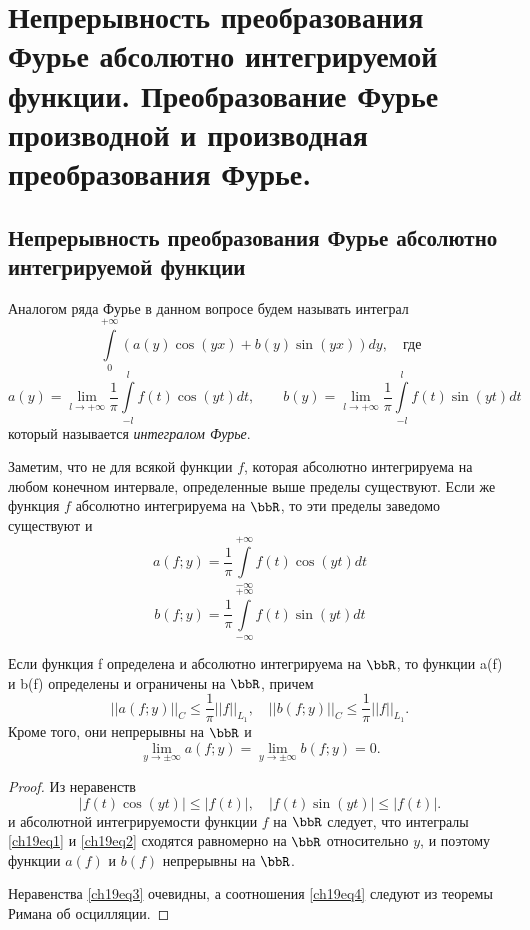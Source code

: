 \chapter{Непрерывность преобразования Фурье абсолютно интегрируемой функции. Преобразование Фурье производной и производная преобразования Фурье.}

\section{Непрерывность преобразования Фурье абсолютно интегрируемой функции}

Аналогом ряда Фурье в данном вопросе будем называть интеграл
$$
\int\limits_{0}^{+\infty} (a(y)\cos(yx) + b(y)\sin(yx))dy,\quad \text{где}
$$
$$
a(y) = \lim_{l \to +\infty}\frac{1}{\pi}\int\limits_{-l}^{l} f(t)\cos(yt)dt,\qquad 
b(y) = \lim_{l \to +\infty}\frac{1}{\pi}\int\limits_{-l}^{l} f(t)\sin(yt)dt
$$
который называется \textit{интегралом Фурье}.

Заметим, что не для всякой функции $f$, которая абсолютно интегрируема на любом конечном интервале, определенные выше пределы существуют. Если же функция $f$ абсолютно интегрируема на $\bbR$, то эти пределы заведомо существуют и
\begin{equation} \label{ch19eq1}
a(f;y) = \frac{1}{\pi}\int\limits_{-\infty}^{+\infty} f(t)\cos(yt)dt
\end{equation}
\begin{equation} \label{ch19eq2}
b(f;y) = \frac{1}{\pi}\int\limits_{-\infty}^{+\infty} f(t)\sin(yt)dt
\end{equation}

\begin{thm}
Если функция f определена и абсолютно интегрируема на $\bbR$, то функции a(f) и b(f) определены и ограничены на $\bbR$, причем
\begin{equation} \label{ch19eq3}
||a(f;y)||_C \le \frac{1}{\pi}||f||_{L_{1}}, \quad ||b(f;y)||_C \le \frac{1}{\pi}||f||_{L_{1}}.
\end{equation}
Кроме того, они непрерывны на $\bbR$ и
\begin{equation} \label{ch19eq4}
\lim_{y \to \pm\infty} a(f;y) = \lim_{y \to \pm\infty} b(f;y) = 0.
\end{equation}
\end{thm}
\begin{proof}
Из неравенств
$$
|f(t)\cos(yt)| \le |f(t)|, \quad |f(t)\sin(yt)| \le |f(t)|.
$$
и абсолютной интегрируемости функции $f$ на $\bbR$ следует, что интегралы \eqref{ch19eq1} и \eqref{ch19eq2} сходятся равномерно на $\bbR$ относительно $y$, и поэтому функции $a(f)$ и $b(f)$ непрерывны на $\bbR$.

Неравенства \eqref{ch19eq3} очевидны, а соотношения \eqref{ch19eq4} следуют из теоремы Римана об осцилляции. 
\end{proof}

